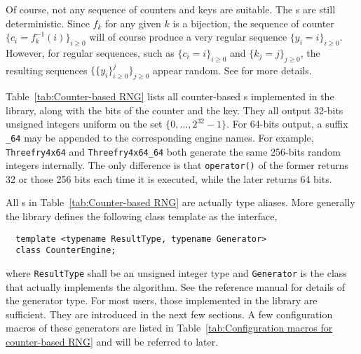 Of course, not any sequence of counters and keys are suitable. The \rng{}s are
still deterministic. Since $f_k$ for any given $k$ is a bijection, the sequence
of counter $\{c_i = f_k^{-1}(i)\}_{i\ge0}$ will of course produce a very
regular sequence $\{y_i = i\}_{i\ge0}$. However, for regular sequences, such
as $\{c_i = i\}_{i\ge0}$ and $\{k_j = j\}_{j\ge0}$, the resulting sequences
$\{\{y_i\}_{i\ge0}^j\}_{j\ge0}$ appear random. See \textcite{Salmon:2011um} for
more details.

Table~\ref{tab:Counter-based RNG} lists all counter-based \rng{}s implemented
in the library, along with the bits of the counter and the key. They all
output 32-bits unsigned integers uniform on the set $\{0,\dots,2^{32}-1\}$. For
64-bits output, a suffix \verb|_64| may be appended to the corresponding \rng
engine names. For example, \verb|Threefry4x64| and \verb|Threefry4x64_64| both
generate the same 256-bits random integers internally. The only difference is
that \verb|operator()| of the former returns 32 or those 256 bits each time it
is executed, while the later returns 64 bits.

All \rng{}s in Table~\ref{tab:Counter-based RNG} are actually type aliases.
More generally the library defines the following class template as the
interface,
\begin{Verbatim}
  template <typename ResultType, typename Generator>
  class CounterEngine;
\end{Verbatim}
where \verb|ResultType| shall be an unsigned integer type and \verb|Generator|
is the class that actually implements the algorithm. See the reference manual
for details of the generator type. For most users, those implemented in the
library are sufficient. They are introduced in the next few sections. A few
configuration macros of these generators are listed in
Table~\ref{tab:Configuration macros for counter-based RNG} and will be referred
to later.

